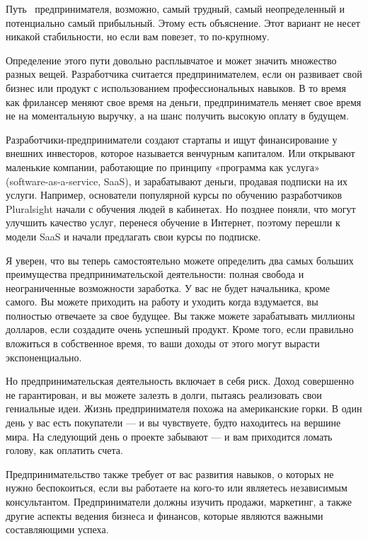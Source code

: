 \documentclass{../industrial-development}
\begin{document}
\lecturenotes

Путь~\cite[с.~62--67]{Sonmez} предпринимателя, возможно, самый трудный, самый неопределенный и потенциально самый прибыльный. Этому есть объяснение. Этот вариант не несет никакой стабильности, но если вам повезет, то по-крупному.

Определение этого пути довольно расплывчатое и может значить множество разных вещей. Разработчика считается предпринимателем, если он развивает свой бизнес или продукт с использованием профессиональных навыков. В то время как фрилансер меняют свое время на деньги, предприниматель меняет свое время не на моментальную выручку, а на шанс получить высокую оплату в будущем.

Разработчики-предприниматели создают стартапы и ищут финансирование у внешних инвесторов, которое называется венчурным капиталом. Или открывают маленькие компании, работающие по принципу «программа как услуга» (software-as-a-service, SaaS), и зарабатывают деньги, продавая подписки на их услуги. Например, основатели популярной курсы по обучению разработчиков Pluralsight начали с обучения людей в кабинетах. Но позднее поняли, что могут улучшить качество услуг, перенеся обучение в Интернет, поэтому перешли к модели SaaS и начали предлагать свои курсы по подписке.

Я уверен, что вы теперь самостоятельно можете определить два самых больших преимущества предпринимательской деятельности: полная свобода и неограниченные возможности заработка. У вас не будет начальника, кроме самого. Вы можете приходить на работу и уходить когда вздумается, вы полностью отвечаете за свое будущее. Вы также можете зарабатывать миллионы долларов, если создадите очень успешный продукт. Кроме того, если правильно вложиться в собственное время, то ваши доходы от этого могут вырасти экспоненциально.

Но предпринимательская деятельность включает в себя риск. Доход совершенно не гарантирован, и вы можете залезть в долги, пытаясь реализовать свои гениальные идеи. Жизнь предпринимателя похожа на американские горки. В один день у вас есть покупатели — и вы чувствуете, будто находитесь на вершине мира. На следующий день о проекте забывают — и вам приходится ломать голову, как оплатить счета.

Предпринимательство также требует от вас развития навыков, о которых не нужно беспокоиться, если вы работаете на кого-то или являетесь независимым консультантом. Предприниматели должны изучить продажи, маркетинг, а также другие аспекты ведения бизнеса и финансов, которые являются важными составляющими успеха. 
\end{document}
